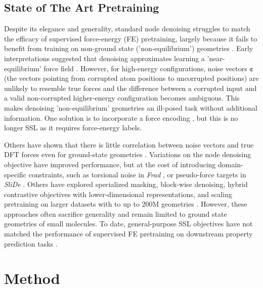 \documentclass{article}
\theoremstyle{plain}
\theoremstyle{definition}
\theoremstyle{remark}
\begin{document}
\subsection{State of The Art Pretraining}
Despite its elegance and generality, standard node denoising struggles to match the efficacy of supervised force-energy (FE) pretraining, largely because it fails to benefit from training on non-ground state ('non-equilibrium') geometries \cite{ETOREO_feng2023}. Early interpretations suggested that denoising approximates learning a 'near-equilibrium' force field \cite{NoisyNodes_Zaidi2023PVD}. However, for high-energy configurations, noise vectors $\boldsymbol{\varepsilon}$ (the vectors pointing from corrupted atom positions to uncorrupted positions) are unlikely to resemble true forces and the difference between a corrupted input and a valid non-corrupted higher-energy configuration becomes ambiguous. This makes denoising 'non-equilibrium' geometries an ill-posed task without additional information. One solution is to incorporate a force encoding \cite{DeNS_liao2024}, but this is no longer SSL as it requires force-energy labels.  

Others have shown that there is little correlation between noise vectors and true DFT forces even for ground-state geometries \cite{SliDe_Ni2025}.  Variations on the node denoising objective have improved performance, but at the cost of introducing domain-specific constraints, such as torsional noise in \textit{Frad} \cite{Frad_Ni2024}, or pseudo-force targets in \textit{SliDe} \cite{SliDe_Ni2025}. Others have explored specialized masking, block-wise denoising,  hybrid contrastive objectives with lower-dimensional representations, and scaling pretraining on larger datasets with to up to 200M geometries \cite{Atomica_Fang2025,UniCorn_Feng2024,EPT_jiao2025, UniMol_Zhou2023}. However, these approaches often sacrifice generality and remain limited to ground state geometries of small molecules. To date, general-purpose SSL objectives have not matched the performance of supervised FE pretraining on downstream property prediction tasks \cite{JMP_Shoghi2023, HackNIP_kim2025}.



\section{Method}
\end{document}

